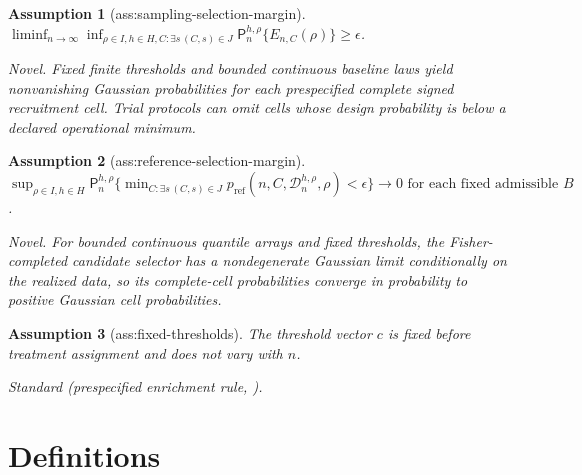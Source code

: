 \documentclass{article}
\newtheorem{assumption}{Assumption}
\begin{document}
\begin{assumption}[ass:sampling-selection-margin]\label{ass:sampling-selection-margin}
\(\liminf_{n\to\infty}\inf_{\rho\in I,h\in H,C:\exists s\,(C,s)\in J}\mathsf P_n^{h,\rho}\{E_{n,C}(\rho)\}\ge\epsilon\).
\par\smallskip\noindent\emph{Novel.} Fixed finite thresholds and bounded continuous baseline laws yield nonvanishing Gaussian probabilities for each prespecified complete signed recruitment cell. Trial protocols can omit cells whose design probability is below a declared operational minimum.
\end{assumption}

\begin{assumption}[ass:reference-selection-margin]\label{ass:reference-selection-margin}
\(\sup_{\rho\in I,h\in H}\mathsf P_n^{h,\rho}\{\min_{C:\exists s\,(C,s)\in J}p_{\mathrm{ref}}(n,C,\mathcal D_n^{h,\rho},\rho)<\epsilon\}\to0\text{ for each fixed admissible }B\).
\par\smallskip\noindent\emph{Novel.} For bounded continuous quantile arrays and fixed thresholds, the Fisher-completed candidate selector has a nondegenerate Gaussian limit conditionally on the realized data, so its complete-cell probabilities converge in probability to positive Gaussian cell probabilities.
\end{assumption}

\begin{assumption}[ass:fixed-thresholds]\label{ass:fixed-thresholds}
The threshold vector \(c\) is fixed before treatment assignment and does not vary with \(n\).
\par\smallskip\noindent\emph{Standard} (prespecified enrichment rule, \cite{RosenblumFangLiu2020OptimalEnrichment}).
\end{assumption}

\section{Definitions}
\end{document}
